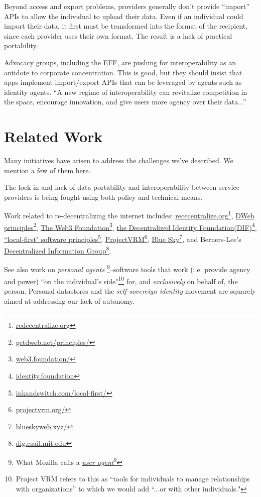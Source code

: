 \documentclass[11pt, oneside]{article}   	%
\newcommand{\hyperfootnote}[1][]{\def\ArgI{{#1}}\hyperfootnoteRelay}
\newcommand\hyperfootnoteRelay[2][]{\href{#1#2}{\ArgI}\footnote{\href{#1#2}{#2}}}
\begin{document}
Beyond access and export problems, providers generally don't provide ``import'' APIs to allow the individual to upload their data. Even if an individual could import their data, it first must be transformed into the format of the recipient, since each provider uses their own format. The result is a lack of practical portability.

Advocacy groups, including the EFF, are pushing for interoperability as an antidote to corporate concentration. This is good, but they should insist that apps implement import/export APIs that can be leveraged by agents such as identity agents. ``A new regime of interoperability can revitalize competition in the space, encourage innovation, and give users more agency over their data...''\cite{Cyphers2021} 

\section{Related Work} %

Many initiatives have arisen to address the challenges we've described. We mention a few of them here.

The lock-in and lack of data portability and interoperability between service providers is being fought using both policy and technical means\cite{Doctorow2021}\cite{Cyphers2021}. 

Work related to re-decentralizing the internet includes: \hyperfootnote[rececentralize.org][https://]{redecentralize.org}, \hyperfootnote[DWeb principles][https://]{getdweb.net/principles/}, \hyperfootnote[The Web3 Foundation][https://]{web3.foundation/}, \hyperfootnote[the Decentralized Identity Foundation(DIF)][https://]{identity.foundation}, \hyperfootnote[``local-first" software principles][https://]{inkandswitch.com/local-first/}, \hyperfootnote[ProjectVRM][https://]{projectvrm.org/}, \hyperfootnote[Blue Sky][https://]{blueskyweb.xyz/}, and Berners-Lee's \hyperfootnote[Decentralized Information Group][https://]{dig.csail.mit.edu}. 

See also work on \emph{personal agents} \footnote{What Mozilla calls a \hyperfootnote[\emph{user agent}][https://]{developer.mozilla.org/en-US/docs/Glossary/User\_agent}}--software tools that work (i.e. provide agency and power) ``on the individual's side"\footnote{Project VRM\cite{Searls2019} refers to this as ``tools for individuals to manage relationships with organizations'' to which we would add ``...or with other individuals."} for, and \emph{exclusively} on behalf of, the person. Personal datastores and the \emph{self-sovereign identity}\cite{Preukschat2021} movement are squarely aimed at addressing our lack of autonomy.
\end{document}
